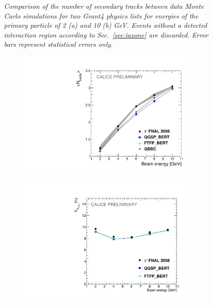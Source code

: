\begin{figure}[H]
\begin{subfigure}{0.5\textwidth}
		\caption{\label{fig:tr10} }
	\end{subfigure}
	\caption{\label{fig:trackexample} \sl Comparison of the number of secondary tracks between data Monte Carlo simulations for two {\sc Geant}4 physics lists  for energies of the primary particle of 2 (a) and 10 (b) GeV. Events without a detected interaction region according to Sec.~\ref{sec:iazone} are discarded. Error bars represent statistical errors only.}
\end{figure}

\begin{figure}[H]
	\centering
	\begin{subfigure}{0.5\textwidth}
		\centering
		\includegraphics[width=.90\linewidth]{ECAL/plots/ntracks-graph.pdf}
		\caption{\label{fig:tracksgraph} }
	\end{subfigure}%
	\begin{subfigure}{0.5\textwidth}
		\centering
		\includegraphics[width=.90\linewidth]{ECAL/plots/delta-ntracks-graph.pdf}

\end{subfigure}
\end{figure}

